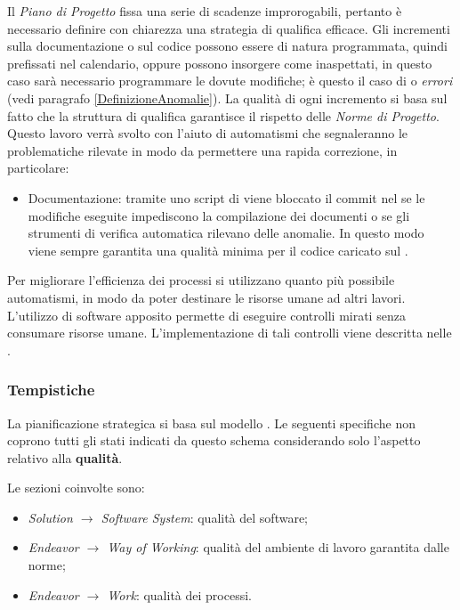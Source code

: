 		Il \emph{Piano di Progetto} fissa una serie di scadenze improrogabili, pertanto è necessario definire con chiarezza una strategia di qualifica efficace. Gli incrementi sulla documentazione o sul codice possono essere di natura programmata, quindi prefissati nel calendario, oppure possono insorgere come inaspettati, in questo caso sarà necessario programmare le dovute modifiche; è questo il caso di  o \emph{errori} (vedi paragrafo \ref{DefinizioneAnomalie}). La qualità di ogni incremento si basa sul fatto che la struttura di qualifica garantisce il rispetto delle \emph{Norme di Progetto}. Questo lavoro verrà svolto con l'aiuto di automatismi che segnaleranno le problematiche rilevate in modo da permettere una rapida correzione, in particolare:
		\begin{itemize}
			\item Documentazione: tramite uno script di  viene bloccato il commit nel  se le modifiche eseguite impediscono la compilazione dei documenti o se gli strumenti di verifica automatica rilevano delle anomalie. In questo modo viene sempre garantita una qualità minima per il codice caricato sul .
		\end{itemize}

	Per migliorare l'efficienza dei processi si utilizzano quanto più possibile automatismi, in modo da poter destinare le risorse umane ad altri lavori. L'utilizzo di software apposito permette di eseguire controlli mirati senza consumare risorse umane. L'implementazione di tali controlli viene descritta nelle \NormeDiProgetto.
	
		\subsubsection{Tempistiche}
		La pianificazione strategica si basa sul modello . Le seguenti specifiche non coprono tutti gli stati indicati da questo schema considerando solo l'aspetto relativo alla \textbf{qualità}. 
		
		Le sezioni coinvolte sono:
			\begin{itemize}
				\item \emph{Solution $\rightarrow$ Software System}: qualità del software;
				\item \emph{Endeavor $\rightarrow$ Way of Working}: qualità del ambiente di lavoro garantita dalle norme;
				\item \emph{Endeavor $\rightarrow$ Work}: qualità dei processi.
			\end{itemize}
		
